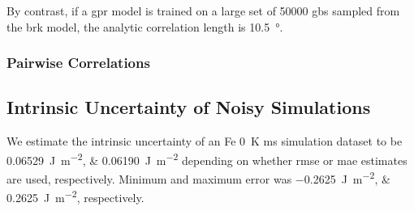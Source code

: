 \documentclass[final,twocolumn,12pt]{elsarticle}
\begin{document}
    By contrast, if a \gls{gpr} model is trained on a large set of \num{50000} \glspl{gb} sampled from the \gls{brk} model, the analytic correlation length is \SI{10.5}{\degree}.

    \subsubsection{Pairwise Correlations} \label{sec:results:correlation:pairwise}
%	
	\subsection{Intrinsic Uncertainty of Noisy  Simulations} \label{sec:results:error}
	We estimate the intrinsic uncertainty of an Fe \SI{0}{\kelvin} \gls{ms} simulation dataset to be \SIlist{0.06529;0.06190}{\joule\per\square\meter} depending on whether \gls{rmse} or \gls{mae} estimates are used, respectively. Minimum and maximum error was \SIlist{-0.2625;0.2625}{\joule\per\square\meter}, respectively.
\end{document}
